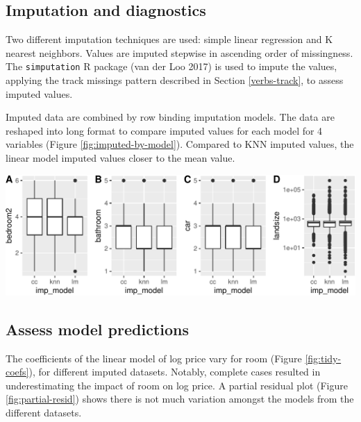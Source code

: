 \documentclass[]{article}
\let\origfigure\figure
\let\endorigfigure\endfigure
\renewenvironment{figure}[1][2] {
    \expandafter\origfigure\expandafter[H]
} {
    \endorigfigure
}
\theoremstyle{definition}
\theoremstyle{definition}
\theoremstyle{definition}
\theoremstyle{remark}
\begin{document}
\hypertarget{case-study-imp-diagnosis}{%
\subsection{Imputation and diagnostics}\label{case-study-imp-diagnosis}}

Two different imputation techniques are used: simple linear regression
and K nearest neighbors. Values are imputed stepwise in ascending order
of missingness. The \texttt{simputation} R package (van der Loo 2017) is
used to impute the values, applying the track missings pattern described
in Section \ref{verbs-track}, to assess imputed values.

Imputed data are combined by row binding imputation models. The data are
reshaped into long format to compare imputed values for each model for 4
variables (Figure \ref{fig:imputed-by-model}). Compared to KNN imputed
values, the linear model imputed values closer to the mean value.

\begin{figure}

{\centering \includegraphics[width=0.95\linewidth]{tidy-missing-data-paper_files/figure-latex/imputed-by-model-1} 

}

\caption{Boxplots of complete case data, and data imputed with KNN or linear model for different variables. (A) number of bedrooms, (B) number of bathrooms, (C) number of carspots, and (D) landsize (on a log10 scale). KNN had similar results to complete case, and linear model had a lower median for cars and fewer extreme values for bedrooms.}\label{fig:imputed-by-model}
\end{figure}

\hypertarget{case-study-assess-model}{%
\subsection{Assess model predictions}\label{case-study-assess-model}}

The coefficients of the linear model of log price vary for room (Figure
\ref{fig:tidy-coefs}), for different imputed datasets. Notably, complete
cases resulted in underestimating the impact of room on log price. A
partial residual plot (Figure \ref{fig:partial-resid}) shows there is
not much variation amongst the models from the different datasets.
\end{document}
